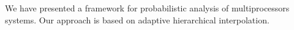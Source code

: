 We have presented a framework for probabilistic analysis of multiprocessors
systems. Our approach is based on adaptive hierarchical interpolation.
